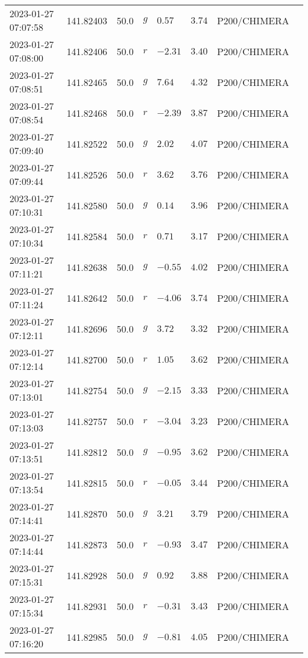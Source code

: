 \documentclass{nature_plusfigure}
\begin{document}
\begin{supplement}
\begin{center}
\begin{longtable}{llllllll}
2023-01-27 07:07:58 & 141.82403 & 50.0 & $g$ & $0.57$ & $3.74$ & P200/CHIMERA &  \\ 
2023-01-27 07:08:00 & 141.82406 & 50.0 & $r$ & $-2.31$ & $3.40$ & P200/CHIMERA &  \\ 
2023-01-27 07:08:51 & 141.82465 & 50.0 & $g$ & $7.64$ & $4.32$ & P200/CHIMERA &  \\ 
2023-01-27 07:08:54 & 141.82468 & 50.0 & $r$ & $-2.39$ & $3.87$ & P200/CHIMERA &  \\ 
2023-01-27 07:09:40 & 141.82522 & 50.0 & $g$ & $2.02$ & $4.07$ & P200/CHIMERA &  \\ 
2023-01-27 07:09:44 & 141.82526 & 50.0 & $r$ & $3.62$ & $3.76$ & P200/CHIMERA &  \\ 
2023-01-27 07:10:31 & 141.82580 & 50.0 & $g$ & $0.14$ & $3.96$ & P200/CHIMERA &  \\ 
2023-01-27 07:10:34 & 141.82584 & 50.0 & $r$ & $0.71$ & $3.17$ & P200/CHIMERA &  \\ 
2023-01-27 07:11:21 & 141.82638 & 50.0 & $g$ & $-0.55$ & $4.02$ & P200/CHIMERA &  \\ 
2023-01-27 07:11:24 & 141.82642 & 50.0 & $r$ & $-4.06$ & $3.74$ & P200/CHIMERA &  \\ 
2023-01-27 07:12:11 & 141.82696 & 50.0 & $g$ & $3.72$ & $3.32$ & P200/CHIMERA &  \\ 
2023-01-27 07:12:14 & 141.82700 & 50.0 & $r$ & $1.05$ & $3.62$ & P200/CHIMERA &  \\ 
2023-01-27 07:13:01 & 141.82754 & 50.0 & $g$ & $-2.15$ & $3.33$ & P200/CHIMERA &  \\ 
2023-01-27 07:13:03 & 141.82757 & 50.0 & $r$ & $-3.04$ & $3.23$ & P200/CHIMERA &  \\ 
2023-01-27 07:13:51 & 141.82812 & 50.0 & $g$ & $-0.95$ & $3.62$ & P200/CHIMERA &  \\ 
2023-01-27 07:13:54 & 141.82815 & 50.0 & $r$ & $-0.05$ & $3.44$ & P200/CHIMERA &  \\ 
2023-01-27 07:14:41 & 141.82870 & 50.0 & $g$ & $3.21$ & $3.79$ & P200/CHIMERA &  \\ 
2023-01-27 07:14:44 & 141.82873 & 50.0 & $r$ & $-0.93$ & $3.47$ & P200/CHIMERA &  \\ 
2023-01-27 07:15:31 & 141.82928 & 50.0 & $g$ & $0.92$ & $3.88$ & P200/CHIMERA &  \\ 
2023-01-27 07:15:34 & 141.82931 & 50.0 & $r$ & $-0.31$ & $3.43$ & P200/CHIMERA &  \\ 
2023-01-27 07:16:20 & 141.82985 & 50.0 & $g$ & $-0.81$ & $4.05$ & P200/CHIMERA &  \\ 

\end{longtable}
\end{center}
\end{supplement}
\end{document}
